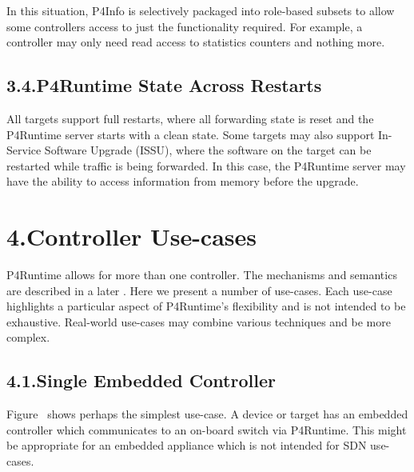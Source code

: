 \documentclass[11pt]{article}
\begin{document}
{%
\noindent{}In this situation, P4Info is selectively packaged into role-based subsets to
allow some controllers access to just the functionality required. For example, a
controller may only need read access to statistics counters and nothing more.%

\subsection{3.4.\hspace*{0.5em}P4Runtime State Across Restarts}\label{sec-restarts}%

\noindent{}All targets support full restarts, where all forwarding state is reset and the
P4Runtime server starts with a clean state.  Some targets may also support
In-Service Software Upgrade (ISSU), where the software on the target can be
restarted while traffic is being forwarded. In this case, the P4Runtime server
may have the ability to access information from memory before the upgrade.%

\section{4.\hspace*{0.5em}Controller Use-cases}\label{sec-controller-use-cases}%

\noindent{}P4Runtime allows for more than one controller. The mechanisms and semantics are
described in a later
. Here we
present a number of use-cases. Each use-case highlights a particular aspect of
P4Runtime's flexibility and is not intended to be exhaustive. Real-world
use-cases may combine various techniques and be more complex.%

\subsection{4.1.\hspace*{0.5em}Single Embedded Controller}\label{sec-single-embedded-controller}%

\noindent{}Figure~ shows perhaps the simplest use-case. A
device or target has an embedded controller which communicates to an on-board
switch via P4Runtime. This might be appropriate for an embedded appliance which
is not intended for SDN use-cases.%

}
\end{document}
